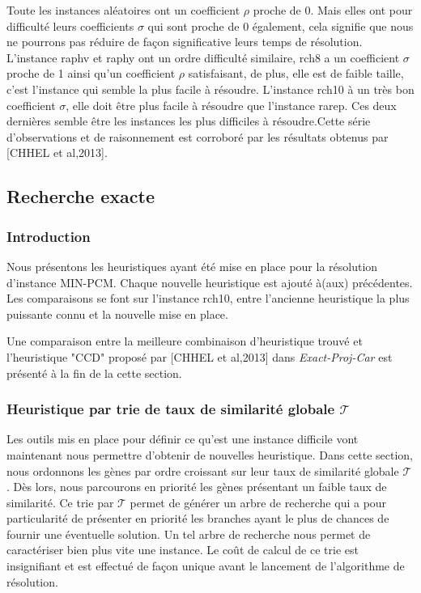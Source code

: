 \documentclass[a4paper,10pt]{article}
\begin{document}
Toute les instances aléatoires ont un coefficient $\rho$ proche de 0. Mais elles ont pour difficulté leurs coefficients $\sigma$ qui sont proche de 0 également, cela signifie que nous ne pourrons pas réduire de façon significative leurs temps de résolution. L'instance raphv et raphy ont un ordre difficulté similaire, rch8 a un coefficient $\sigma$ proche de 1 ainsi qu'un coefficient $\rho$ satisfaisant, de plus, elle est de faible taille, c'est l'instance qui semble la plus facile à résoudre. L'instance rch10 à un très bon coefficient $\sigma$, elle doit être plus facile à résoudre que l'instance rarep. Ces deux dernières semble être les instances les plus difficiles à résoudre.Cette série d'observations et de raisonnement est corroboré par les résultats obtenus par [CHHEL et al,2013].

\subsection{Recherche exacte}
\subsubsection{Introduction}
Nous présentons les heuristiques ayant été mise en place pour la résolution d'instance MIN-PCM. Chaque nouvelle heuristique est ajouté à(aux) précédentes. Les comparaisons se font sur l'instance rch10, entre l'ancienne heuristique la plus puissante connu et la nouvelle mise en place. 

Une comparaison entre la meilleure combinaison d'heuristique trouvé et l'heuristique "CCD" proposé par [CHHEL et al,2013] dans \textit{Exact-Proj-Car} est présenté à la fin de la cette section.

\subsubsection{Heuristique par trie de taux de similarité globale $\mathcal{T}$ }
Les outils mis en place pour définir ce qu'est une instance difficile vont maintenant nous permettre d'obtenir de nouvelles heuristique. Dans cette section, nous ordonnons les gènes par ordre croissant sur leur taux de similarité globale $\mathcal{T}$. Dès lors, nous parcourons en priorité les gènes présentant un faible taux de similarité. Ce trie par $\mathcal{T}$ permet de générer un arbre de recherche qui a pour particularité de présenter en priorité les branches ayant le plus de chances de fournir une éventuelle solution. Un tel arbre de recherche nous permet de caractériser bien plus vite une instance. Le coût de calcul de ce trie est insignifiant et est effectué de façon unique avant le lancement de l'algorithme de résolution.
\end{document}

